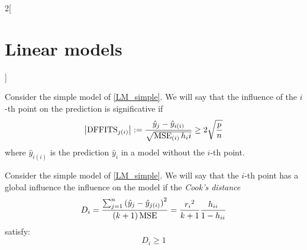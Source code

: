 \documentclass[../../../main_math.tex]{subfiles}
\begin{document}
\begin{multicols}{2}[\section{Linear models}]
\begin{definition}
  \end{definition}
  \begin{definition}
    Consider the simple model of \cref{LM_simple}. We will say that the influence of the $i$-th point on the prediction is significative if $$\abs{\mathrm{DFFITS}_{j(i)}}:=\frac{\hat{y}_j-\hat{y}_{i(i)}}{\sqrt{\operatorname{MSE}_{(i)}h_ii}}\geq 2\sqrt{\frac{p}{n}}$$ where $\hat{y}_{i(i)}$ is the prediction $\hat{y}_{i}$ in a model without the $i$-th point.
  \end{definition}
  \begin{definition}
    Consider the simple model of \cref{LM_simple}. We will say that the $i$-th point has a global influence the influence on the model if the \emph{Cook's distance} $$D_i=\frac{\sum_{j=1}^n{(\hat{y}_j-\hat{y}_{j(i)})}^2}{(k+1)\operatorname{MSE}}=\frac{{r_i}^2}{k+1}\frac{h_{ii}}{1-h_{ii}}$$ satisfy: $$D_i\geq 1$$
  \end{definition}

\end{multicols}
\end{document}
